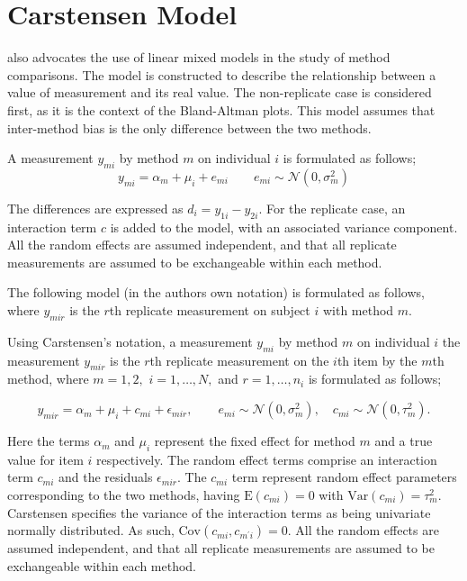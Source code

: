 \documentclass[12pt, a4paper]{report}
\theoremstyle{plain}
\theoremstyle{definition}
\theoremstyle{remark}
\begin{document}
\section{Carstensen Model}
\citet{BXC2004} also advocates the use of linear mixed models in the study of method comparisons. The model is constructed to
describe the relationship between a value of measurement and its real value. The non-replicate case is considered first, as it is
the context of the Bland-Altman plots. This model assumes that inter-method bias is the only difference between the two methods.

A measurement $y_{mi}$ by method $m$ on individual $i$ is formulated as follows;
\begin{equation}
y_{mi}  = \alpha_{m} + \mu_{i} + e_{mi} \qquad  e_{mi} \sim
\mathcal{N}(0,\sigma^{2}_{m})
\end{equation}

The differences are expressed as $d_{i} = y_{1i} - y_{2i}$. For the replicate case, an interaction term $c$ is added to the model, with an associated variance component. All the random effects are assumed independent, and that all replicate measurements are assumed to be exchangeable within each method.


The following model (in the authors own notation) is
formulated as follows, where $y_{mir}$ is the $r$th replicate measurement on subject $i$ with method $m$.


Using Carstensen's notation, a measurement $y_{mi}$ by method $m$ on individual $i$ the measurement $y_{mir} $ is the $r$th replicate measurement on the $i$th item by the $m$th method, where $m=1,2,$ $i=1,\ldots,N,$ and $r = 1,\ldots,n_i$ is formulated as follows;

\begin{equation}
y_{mir}  = \alpha_{m} + \mu_{i} + c_{mi} + \epsilon_{mir}, \qquad  e_{mi}
\sim \mathcal{N}(0,\sigma^{2}_{m}), \quad c_{mi} \sim \mathcal{N}(0,\tau^{2}_{m}).
\end{equation}


Here the terms $\alpha_{m}$ and $\mu_{i}$ represent the fixed effect for method $m$ and a true value for item $i$ respectively. The random effect terms comprise an interaction term $c_{mi}$ and the residuals $\epsilon_{mir}$.
The $c_{mi}$ term represent random effect parameters corresponding to the two methods, having $\mathrm{E}(c_{mi})=0$ with $\mathrm{Var}(c_{mi})=\tau^2_m$. Carstensen specifies the variance of the interaction terms as being univariate normally distributed. As such, $\mathrm{Cov}(c_{mi}, c_{m^\prime i})= 0.$ All the random effects are assumed independent, and that all replicate measurements are assumed to be exchangeable within each method.
\end{document}
